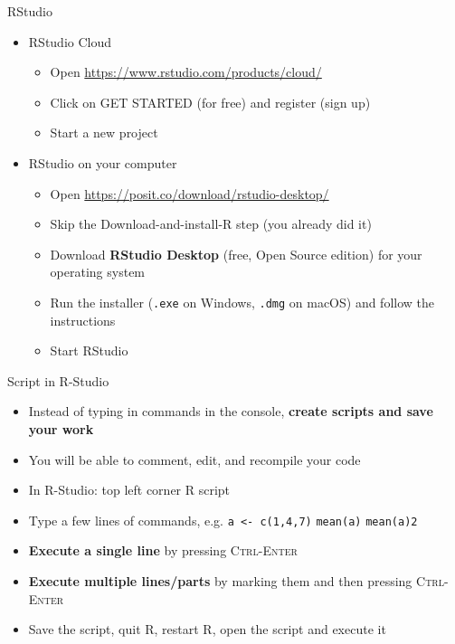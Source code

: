 \documentclass[aspectratio=169]{beamer}
\begin{document}
\begin{frame}{RStudio}
\begin{itemize}
    \item RStudio Cloud
    \begin{itemize}
        \item[$\bullet$] Open \url{https://www.rstudio.com/products/cloud/}\smallskip
        \item[$\bullet$] Click on GET STARTED (for free) and register (sign up)\smallskip
        \item[$\bullet$] Start a new project
    \end{itemize}
\end{itemize}
\vspace{0.3cm}

\begin{itemize}
    \item RStudio on your computer
    \begin{itemize}
        \item[$\bullet$] Open \url{https://posit.co/download/rstudio-desktop/}\smallskip
        \item[$\bullet$] Skip the Download-and-install-R step (you already did it)\smallskip
        \item[$\bullet$] Download \textbf{RStudio Desktop} (free, Open Source edition) for your operating system\smallskip
        \item[$\bullet$] Run the installer (\texttt{.exe} on Windows, \texttt{.dmg} on macOS) and follow the instructions\smallskip
        \item[$\bullet$] Start RStudio
    \end{itemize}
\end{itemize}
\end{frame}

\begin{frame}{Script in R-Studio}
\begin{itemize}
    \item Instead of typing in commands in the console, \textbf{create scripts and save your work}\smallskip
    \item You will be able to comment, edit, and recompile your code\smallskip
    \item In R-Studio: top left corner R script\smallskip
    \item Type a few lines of commands, e.g.\newline
    \texttt{a <- c(1,4,7)}\newline
    \texttt{mean(a)}\newline
    \texttt{mean(a)2}\smallskip
    \item \textbf{Execute a single line} by pressing \textsc{Ctrl-Enter}\smallskip
    \item \textbf{Execute multiple lines/parts} by marking them and then pressing \textsc{Ctrl-Enter}\smallskip
    \item Save the script, quit R, restart R, open the script and execute it
\end{itemize}
\end{frame}
\end{document}

